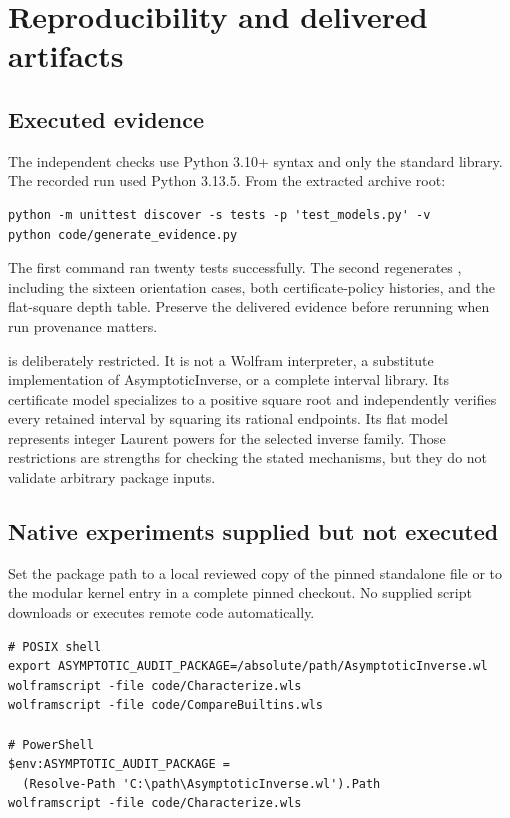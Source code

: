 \appendix
\section{Reproducibility and delivered artifacts}

\subsection{Executed evidence}

The independent checks use Python 3.10+ syntax and only the standard library. The recorded run used Python 3.13.5. From the extracted archive root:
\begin{lstlisting}
python -m unittest discover -s tests -p 'test_models.py' -v
python code/generate_evidence.py
\end{lstlisting}
The first command ran twenty tests successfully. The second regenerates , including the sixteen orientation cases, both certificate-policy histories, and the flat-square depth table. Preserve the delivered evidence before rerunning when run provenance matters.

 is deliberately restricted. It is not a Wolfram interpreter, a substitute implementation of AsymptoticInverse, or a complete interval library. Its certificate model specializes to a positive square root and independently verifies every retained interval by squaring its rational endpoints. Its flat model represents integer Laurent powers for the selected inverse family. Those restrictions are strengths for checking the stated mechanisms, but they do not validate arbitrary package inputs.

\subsection{Native experiments supplied but not executed}

Set the package path to a local reviewed copy of the pinned standalone file or to the modular kernel entry in a complete pinned checkout. No supplied script downloads or executes remote code automatically.
\begin{lstlisting}
# POSIX shell
export ASYMPTOTIC_AUDIT_PACKAGE=/absolute/path/AsymptoticInverse.wl
wolframscript -file code/Characterize.wls
wolframscript -file code/CompareBuiltins.wls

# PowerShell
$env:ASYMPTOTIC_AUDIT_PACKAGE =
  (Resolve-Path 'C:\path\AsymptoticInverse.wl').Path
wolframscript -file code/Characterize.wls
\end{lstlisting}

